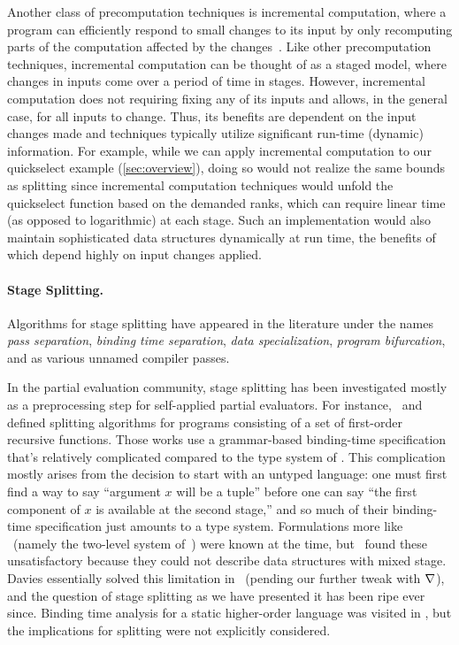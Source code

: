 Another class of precomputation techniques is incremental
computation, where a program can efficiently respond to small changes
to its input by only recomputing parts of the computation affected
by the
changes~\cite{DemersReTe81,PughTe89,RamalingamRe93,AcarBlBlHaTa09}.
Like other precomputation techniques, incremental computation can be
thought of as a staged model, where changes in inputs come over a
period of time in stages.
%
However, incremental computation does not requiring fixing any of its
inputs and allows, in the general case, for all inputs to
change. Thus, its benefits are dependent on the input changes made and
techniques typically utilize significant run-time (dynamic)
information.  For example, while we can apply incremental computation
to our quickselect example (\ref{sec:overview}), doing so would not
realize the same bounds as splitting since incremental computation
techniques would unfold the quickselect function based on the demanded
ranks, which can require linear time (as opposed to logarithmic) at
each stage.  Such an implementation would also maintain sophisticated
data structures dynamically at run time, the benefits of which depend
highly on input changes applied.

\paragraph{Stage Splitting.}

Algorithms for stage splitting have appeared in the literature under the names 
{\em pass separation}, {\em binding time separation}, {\em data specialization}, 
{\em program bifurcation}, and as various unnamed compiler passes.

In the partial evaluation community, stage splitting has been investigated 
mostly as a preprocessing step for self-applied partial evaluators. 
For instance,~\cite{Mogensen89a} and~\cite{DeNiel91} defined splitting algorithms
for programs consisting of a set of first-order recursive functions.
Those works use a grammar-based binding-time specification that's 
relatively complicated compared to the type system of \lang.
This complication mostly arises from the decision to start with an untyped language:
one must first find a way to say ``argument $x$ will be a tuple'' before one can say
``the first component of $x$ is available at the second stage,'' 
and so much of their binding-time specification just amounts to a type system.
Formulations more like \lang\ (namely the two-level system of~\cite{NN92-twolevel}) were known at the time,
but~\cite{Mogensen89a} found these unsatisfactory because they could not describe data structures with mixed stage.
Davies essentially solved this limitation in~\cite{davies96} (pending our further tweak with $\nabla$),
and the question of stage splitting as we have presented it has been ripe ever since.
Binding time analysis for a static higher-order language was visited in \cite{Mogensen89b},
but the implications for splitting were not explicitly considered.

